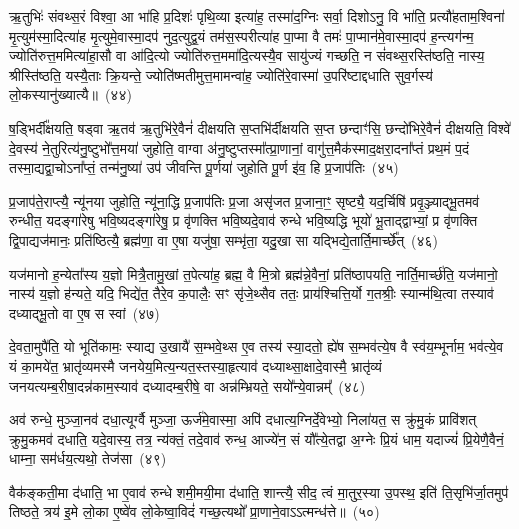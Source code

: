 ऋ॒तुभिः॑ संवथ्स॒रं विश्वा॒ आ भा॑हि प्र॒दिशः॑ पृथि॒व्या इत्या॑ह॒ तस्मा॑द॒ग्निः सर्वा॒ दिशो\-ऽनु॒ वि भा॑ति॒ प्रत्यौ॑हताम॒श्विना॑ मृ॒त्युम॑स्मा॒दित्या॑ह मृ॒त्युमे॒वास्मा॒दप॑ नुद॒त्युद्व॒यं तम॑स॒स्परीत्या॑ह पा॒प्मा वै तमः॑ पा॒प्मान॑मे॒वास्मा॒दप॑ ह॒न्त्यग॑न्म॒ ज्योति॑रुत्त॒ममित्या॑हा॒सौ वा आ॑दि॒त्यो ज्योति॑रुत्त॒ममा॑दि॒त्यस्यै॒व सायु॑ज्यं गच्छति॒ न सं॑वथ्स॒रस्ति॑ष्ठति॒ नास्य॒ श्रीस्ति॑ष्ठति॒ यस्यै॒ताः क्रि॒यन्ते॒ ज्योति॑ष्मतीमुत्त॒मामन्वा॑ह॒ ज्योति॑रे॒वास्मा॑ उ॒परि॑ष्टाद्दधाति सुव॒र्गस्य॑ लो॒कस्यानु॑ख्यात्यै॥~(४४)

{\anuvakamend[{याव॑न्तो\-ऽस्य मुख॒तश्चित्य॑स्य वर्धयत्यादि॒त्यो᳚\-ऽष्टाविꣳ॑शतिश्च}]}%

ष॒ड्भिर्दी᳚क्षयति॒ षड्वा ऋ॒तव॑ ऋ॒तुभि॑रे॒वैनं॑ दीक्षयति स॒प्तभि॑र्दीक्षयति स॒प्त छन्दाꣳ॑सि॒ छन्दो॑भिरे॒वैनं॑ दीक्षयति॒ विश्वे॑ दे॒वस्य॑ ने॒तुरित्य॑नु॒ष्टुभो᳚त्त॒मया॑ जुहोति॒ वाग्वा अ॑नु॒ष्टुप्तस्मा᳚त्प्रा॒णानां॒ वागु॑त्त॒मैक॑स्माद॒क्षरा॒दना᳚प्तं प्रथ॒मं प॒दं तस्मा॒द्यद्वा॒चो\-ऽना᳚प्तं॒ तन्म॑नु॒ष्या॑ उप॑ जीवन्ति पू॒र्णया॑ जुहोति पू॒र्ण इ॑व॒ हि प्र॒जा\-प॑तिः~(४५)

प्र॒जा\-प॑ते॒राप्त्यै॒ न्यू॑नया जुहोति॒ न्यू॑ना॒द्धि प्र॒जा\-प॑तिः प्र॒जा असृ॑जत प्र॒जाना॒ꣳ॒ सृष्ट्यै॒ यद॒र्चिषि॑ प्रवृ॒ञ्ज्याद्भू॒तमव॑ रुन्धीत॒ यदङ्गा॑रेषु भवि॒ष्यदङ्गा॑रेषु॒ प्र वृ॑णक्ति भवि॒ष्यदे॒वाव॑ रुन्धे भवि॒ष्यद्धि भूयो॑ भू॒ताद्द्वाभ्यां॒ प्र वृ॑णक्ति द्वि॒पाद्यज॑मानः॒ प्रति॑ष्ठित्यै॒ ब्रह्म॑णा॒ वा ए॒षा यजु॑षा॒ सम्भृ॑ता॒ यदु॒खा सा यद्भिद्ये॒तार्ति॒मार्च्छे᳚त्~(४६)

यज॑मानो ह॒न्येता᳚स्य य॒ज्ञो मित्रै॒तामु॒खां त॒पेत्या॑ह॒ ब्रह्म॒ वै मि॒त्रो ब्रह्म॑न्ने॒वैनां॒ प्रति॑\-ष्ठापयति॒ नार्ति॒मार्च्छ॑ति॒ यज॑मानो॒ नास्य॑ य॒ज्ञो ह॑न्यते॒ यदि॒ भिद्ये॑त॒ तैरे॒व क॒पालैः॒ सꣳ सृ॑जे॒थ्सैव ततः॒ प्राय॑श्चित्ति॒र्यो ग॒तश्रीः॒ स्यान्म॑थि॒त्वा तस्याव॑ दध्याद्भू॒तो वा ए॒ष स स्वां~(४७)

दे॒वता॒मुपै॑ति॒ यो भूति॑कामः॒ स्याद्य उ॒खायै॑ स॒म्भवे॒थ्स ए॒व तस्य॑ स्या॒दतो॒ ह्ये॑ष स॒म्भव॑त्ये॒ष वै स्व॑य॒म्भूर्नाम॒ भव॑त्ये॒व यं का॒मये॑त॒ भ्रातृ॑व्यमस्मै जनयेय॒मित्य॒न्यत॒स्तस्या॒हृत्याव॑ दध्याथ्सा॒क्षादे॒वास्मै॒ भ्रातृ॑व्यं जनयत्यम्ब॒रीषा॒\-दन्न॑काम॒स्याव॑ दध्यादम्ब॒रीषे॒ वा अन्न॑म्भ्रियते॒ सयो᳚न्ये॒वान्नम्᳚~(४८)

अव॑ रुन्धे॒ मुञ्जा॒नव॑ दधा॒त्यूर्ग्वै मुञ्जा॒ ऊर्ज॑मे॒वास्मा॒ अपि॑ दधात्य॒ग्निर्दे॒वेभ्यो॒ निला॑यत॒ स क्रु॑मु॒कं प्रावि॑शत् क्रुमु॒कमव॑ दधाति॒ यदे॒वास्य॒ तत्र॒ न्य॑क्तं॒ तदे॒वाव॑ रुन्ध॒ आज्ये॑न॒ सं यौ᳚त्ये॒तद्वा अ॒ग्नेः प्रि॒यं धाम॒ यदाज्यं॑ प्रि॒येणै॒वैनं॒ धाम्ना॒ सम॑र्धय॒त्यथो॒ तेज॑सा~(४९)

वैक॑ङ्कती॒मा द॑धाति॒ भा ए॒वाव॑ रुन्धे शमी॒मयी॒मा द॑धाति॒ शान्त्यै॒ सीद॒ त्वं मा॒तुर॒स्या उ॒पस्थ॒ इति॑ ति॒सृभि॑र्जा॒तमुप॑ तिष्ठते॒ त्रय॑ इ॒मे लो॒का ए॒ष्वे॑व लो॒केष्वा॒विदं॑ गच्छ॒त्यथो᳚ प्रा॒णाने॒वा\-ऽऽ\-त्मन्ध॑त्ते॥~(५०)

